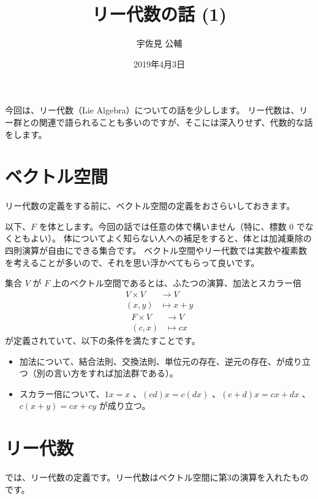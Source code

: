 \documentclass{ltjsarticle}
\title{リー代数の話 (1)}
\author{宇佐見 公輔}
\date{2019年4月3日}
\begin{document}
\maketitle

今回は、リー代数（Lie Algebra）についての話を少しします。
リー代数は、リー群との関連で語られることも多いのですが、そこには深入りせず、代数的な話をします。

\section{ベクトル空間}

リー代数の定義をする前に、ベクトル空間の定義をおさらいしておきます。

以下、$F$ を体とします。今回の話では任意の体で構いません（特に、標数 $0$ でなくともよい）。
体についてよく知らない人への補足をすると、体とは加減乗除の四則演算が自由にできる集合です。
ベクトル空間やリー代数では実数や複素数を考えることが多いので、それを思い浮かべてもらって良いです。

\begin{definition}[ベクトル空間]
    集合 $V$ が $F$ 上のベクトル空間であるとは、ふたつの演算、加法とスカラー倍
    \begin{align*}
        V \times V & \to V         \\
        (x, y)     & \mapsto x + y
    \end{align*}
    \begin{align*}
        F \times V & \to V      \\
        (c, x)     & \mapsto cx
    \end{align*}
    が定義されていて、以下の条件を満たすことです。
    \begin{itemize}
        \item 加法について、結合法則、交換法則、単位元の存在、逆元の存在、が成り立つ（別の言い方をすれば加法群である）。
        \item スカラー倍について、$1x = x$ 、$(cd)x = c(dx)$ 、$(c + d)x = cx + dx$ 、$c(x + y) = cx + cy$
              が成り立つ。
    \end{itemize}
\end{definition}

\section{リー代数}

では、リー代数の定義です。リー代数はベクトル空間に第3の演算を入れたものです。
\end{document}
